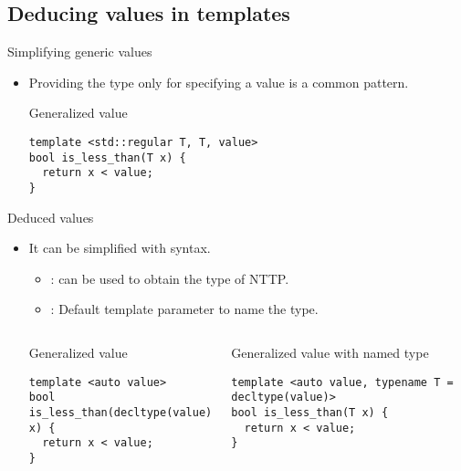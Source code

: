 \subsection{Deducing values in templates}

\begin{frame}[t,fragile]{Simplifying generic values}
\begin{itemize}
  \item Providing the type only for specifying a value is a common pattern.

\begin{block}{Generalized value}
\begin{lstlisting}
template <std::regular T, T, value>
bool is_less_than(T x) {
  return x < value;
}
\end{lstlisting}
\end{block}

\end{itemize}
\end{frame}

\begin{frame}[t,fragile]{Deduced values}

\begin{itemize}
  \item It can be simplified with  syntax.
    \begin{itemize}
      \item {}:  can be used to obtain
            the type of NTTP.
      \item {}: Default template parameter to name the type.
    \end{itemize}

\begin{columns}[T]

\begin{block}{Generalized value}
\begin{lstlisting}
template <auto value>
bool is_less_than(decltype(value) x) {
  return x < value;
}
\end{lstlisting}
\end{block}

\pause
{}
\begin{block}{Generalized value with named type}
\begin{lstlisting}
template <auto value, typename T = decltype(value)>
bool is_less_than(T x) {
  return x < value;
}
\end{lstlisting}
\end{block}

\end{columns}

\end{itemize}
\end{frame}
